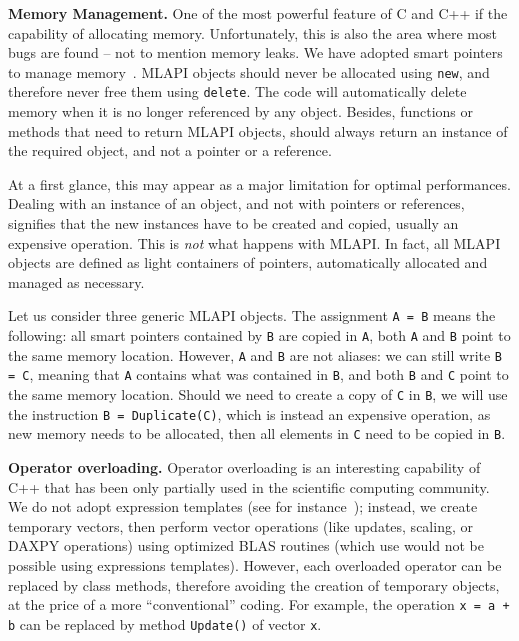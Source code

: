 \documentclass{article}[11pt]
\newcommand{\teuchos}  {{\sc Teuchos}}
\newcommand{\MLAPI}  {{\sc MLAPI }}
\newcommand{\MLAPIns}  {{\sc MLAPI}}
\begin{document}
\bigskip

\noindent
{\bf Memory Management.} One of the most powerful feature of C and C++
if the capability of allocating memory. Unfortunately, this is also the
area where most bugs are found -- not to mention memory leaks. We have adopted
smart pointers to manage memory~\cite{barlett04teuchos}.
\MLAPI objects should never be allocated using {\tt new}, and therefore never
free them using {\tt delete}. The code will automatically delete memory
when it is no longer referenced by any object. Besides, functions or methods
that need to return \MLAPI objects, should always return an instance of the
required object, and not a pointer or a reference.

\noindent
At a first glance, this may appear as a major limitation for optimal
performances. Dealing with an instance of an object, and not with pointers or
references, signifies that the new instances have to be created and copied,
usually an expensive operation. This is {\sl not} what happens with \MLAPIns. In
fact, all \MLAPI objects are defined as light containers of pointers,
  automatically allocated and managed as necessary. 

\noindent
Let us consider three generic \MLAPI objects.
The assignment \verb!A = B! means the following: all smart pointers contained
by \verb!B! are copied in \verb!A!, both \verb!A! and \verb!B! point to the
same memory location. However, \verb!A! and \verb!B! are not aliases: we can
still write \verb!B = C!, meaning that \verb!A! contains what was contained in
\verb!B!, and both \verb!B! and \verb!C! point to the same memory location. 
Should we need to create a copy of \verb!C! in \verb!B!, we will use the
instruction \verb!B = Duplicate(C)!, which is instead an expensive operation, as new memory
needs to be allocated, then all elements in \verb!C! need to be copied in
\verb!B!.

\medskip

\noindent
{\bf Operator overloading.} Operator overloading is an 
interesting capability of C++ that has been only
partially used in the scientific computing community. We do not adopt expression
templates (see for instance~\cite{vandevoorde03cpp}); instead, we
create temporary vectors, then perform vector operations (like updates,
scaling, or DAXPY operations) using optimized BLAS routines 
(which use would not be possible using expressions templates). 
However, each overloaded operator can be replaced by class methods, therefore
avoiding the creation of temporary objects, at the price of a more
``conventional'' coding. For example, the operation {\tt x = a + b} can be
replaced by method {\tt Update()} of vector {\tt x}.
\end{document}
